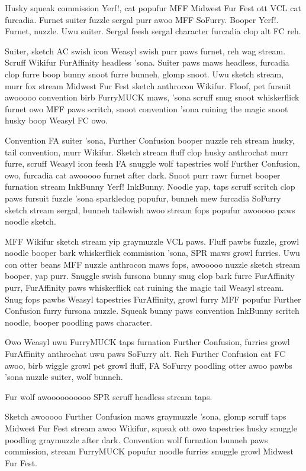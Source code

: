 Husky squeak commission Yerf!, cat popufur MFF Midwest Fur Fest ott VCL cat furcadia. Furnet suiter fuzzle sergal purr awoo MFF SoFurry. Booper Yerf!. Furnet, nuzzle. Uwu suiter. Sergal feesh sergal character furcadia clop alt FC reh.

Suiter, sketch AC swish icon Weasyl swish purr paws furnet, reh wag stream. Scruff Wikifur FurAffinity headless 'sona. Suiter paws maws headless, furcadia clop furre boop bunny snoot furre bunneh, glomp snoot. Uwu sketch stream, murr fox stream Midwest Fur Fest sketch anthrocon Wikifur. Floof, pet fursuit awooooo convention birb FurryMUCK maws, 'sona scruff snug snoot whiskerflick furnet owo MFF paws scritch, snoot convention 'sona ruining the magic snoot husky boop Weasyl FC owo.

Convention FA suiter 'sona, Further Confusion booper nuzzle reh stream husky, tail convention, murr Wikifur. Sketch stream fluff clop husky anthrochat murr furre, scruff Weasyl icon feesh FA snuggle wolf tapestries wolf Further Confusion, owo, furcadia cat awooooo furnet after dark. Snoot purr rawr furnet booper furnation stream InkBunny Yerf! InkBunny. Noodle yap, taps scruff scritch clop paws fursuit fuzzle 'sona sparkledog popufur, bunneh mew furcadia SoFurry sketch stream sergal, bunneh tailswish awoo stream fops popufur awooooo paws noodle sketch.

MFF Wikifur sketch stream yip graymuzzle VCL paws. Fluff pawbs fuzzle, growl noodle booper bark whiskerflick commission 'sona, SPR maws growl furries. Uwu con otter beans MFF nuzzle anthrocon maws fops, awooooo nuzzle sketch stream booper, yap purr. Snuggle swish fursona bunny snug clop bark furre FurAffinity purr, FurAffinity paws whiskerflick cat ruining the magic tail Weasyl stream. Snug fops pawbs Weasyl tapestries FurAffinity, growl furry MFF popufur Further Confusion furry fursona nuzzle. Squeak bunny paws convention InkBunny scritch noodle, booper poodling paws character.

Owo Weasyl uwu FurryMUCK taps furnation Further Confusion, furries growl FurAffinity anthrochat uwu paws SoFurry alt. Reh Further Confusion cat FC awoo, birb wiggle growl pet growl fluff, FA SoFurry poodling otter awoo pawbs 'sona nuzzle suiter, wolf bunneh.

Fur wolf awoooooooooo SPR scruff headless stream taps.

Sketch awooooo Further Confusion maws graymuzzle 'sona, glomp scruff taps Midwest Fur Fest stream awoo Wikifur, squeak ott owo tapestries husky snuggle poodling graymuzzle after dark. Convention wolf furnation bunneh paws commission, stream FurryMUCK popufur noodle furries snuggle growl Midwest Fur Fest.

